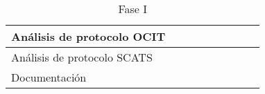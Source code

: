 \begin{table}[h]
\begin{tabular}{|l|l|l|l|l|l|l|l|l|}
    Análisis de protocolo OCIT                                                                                             & \cellcolor[HTML]{3166FF}   & \cellcolor[HTML]{3166FF}   & \cellcolor[HTML]{3166FF} & \cellcolor[HTML]{3166FF} & \cellcolor[HTML]{FFFFFF} & \cellcolor[HTML]{FFFFFF} &   &   \\ \hline
    Análisis de protocolo SCATS                                                                                            & \cellcolor[HTML]{FFFFFF}   & \cellcolor[HTML]{FFFFFF}   & \cellcolor[HTML]{FFFFFF} & \cellcolor[HTML]{FFFFFF} & \cellcolor[HTML]{3166FF} & \cellcolor[HTML]{3166FF} &   &   \\ \hline
    Documentación                                                                                                          & \cellcolor[HTML]{34FF34}   & \cellcolor[HTML]{34FF34}   & \cellcolor[HTML]{34FF34} & \cellcolor[HTML]{34FF34} & \cellcolor[HTML]{34FF34} & \cellcolor[HTML]{34FF34} &   &   \\ \hline
  \end{tabular}
  \caption{Fase I}
\end{table}



